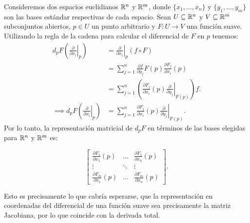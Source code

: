 Consideremos dos espacios euclidianos $\mathbb{R}^n$ y $\mathbb{R}^m$, donde $\{x_1, \dots, x_n\}$ y $\{y_1, \dots, y_m\}$ son las bases estándar respectivas de cada espacio. Sean $U \subseteq \mathbb{R}^n$ y $V \subseteq \mathbb{R}^m$ subconjuntos abiertos, $p \in U$ un punto arbitrario y $F: U \to V$ una función suave. Utilizando la regla de la cadena para calcular el diferencial de $F$ en $p$ tenemos:
\begin{align*}
	d_{p}F
	\left(
	\left. \frac{\partial}{\partial x_i} \right|_{p}
	\right)
	 & =
	\left. \frac{\partial}{\partial x_i} \right|_{p} (f \circ F) \\
	 & =
	\sum_{j=1}^{n} \frac{\partial f}{\partial y_j} F(p)
	\frac{\partial F_j}{\partial x_i} (p)                        \\
	 & =
	\sum_{j=1}^{n}
	\left(
	\frac{\partial F_j}{\partial x_i} (p)
	\left.
	\frac{\partial}{\partial y_j}
	\right|_{F(p)}
	\right) f.                                                   \\
	\implies d_p F
	\left(
	\left. \frac{\partial}{\partial x_i} \right|_p
	\right)
	 & =
	\sum_{j=1}^{n}
	\frac{\partial F_j}{\partial x_i} (p)
	\left.
	\frac{\partial}{\partial y_j}
	\right|_{F(p)}.
\end{align*}
Por lo tanto, la representación matricial de $d_{p}F$ en términos de las bases elegidas para $\mathbb{R}^n$ y $\mathbb{R}^m$ es:

\[
	\begin{bmatrix}
		\frac{\partial F_1}{\partial x_1}(p) & \hdots & \frac{\partial F_1}{\partial x_n}(p) \\[24pt]
		\vdots                               & \ddots & \vdots                               \\[24pt]
		\frac{\partial F_m}{\partial x_1}(p) & \hdots & \frac{\partial F_m}{\partial x_n}(p)
	\end{bmatrix}.
\]

Esto es precisamente lo que cabría esperarse, que la representación en coordenadas del diferencial de una función suave sea precisamente la matriz Jacobiana, por lo que coincide con la derivada total.

